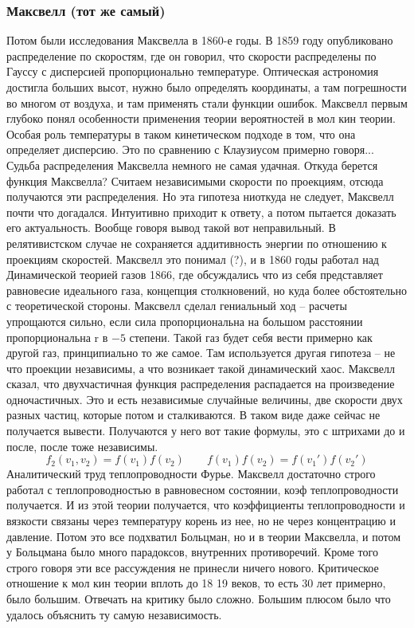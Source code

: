 \documentclass[a4paper, 12pt]{article}
\begin{document}
\subsubsection{Максвелл (тот же самый)}

Потом были исследования Максвелла в 1860-е годы. В 1859 году 
опубликовано распределение по скоростям, где он говорил, что скорости 
распределены по Гауссу с дисперсией пропорционально температуре. 
Оптическая астрономия достигла больших высот, нужно было определять 
координаты, а там погрешности во многом от воздуха, и там применять 
стали функции ошибок. Максвелл первым глубоко понял особенности 
применения теории вероятностей в мол кин теории. Особая роль температуры 
в таком кинетическом подходе в том, что она определяет дисперсию. Это по 
сравнению с Клаузиусом примерно говоря... Судьба распределения Максвелла 
немного не самая удачная. Откуда берется функция Максвелла? Считаем 
независимыми скорости по проекциям, отсюда получаются эти распределения. 
Но эта гипотеза ниоткуда не следует, Максвелл почти что догадался. 
Интуитивно приходит к ответу, а потом пытается доказать его 
актуальность. Вообще говоря вывод такой вот неправильный. 
В релятивистском случае не сохраняется аддитивность энергии по отношению 
к проекциям скоростей. Максвелл это понимал (?), и в 1860 годы работал 
над Динамической теорией газов 1866, где обсуждались что из себя 
представляет равновесие идеального газа, концепция столкновений, но куда 
более обстоятельно с теоретической стороны. Максвелл сделал гениальный 
ход -- расчеты упрощаются сильно, если сила пропорциональна на большом 
расстоянии пропорциональна r в $-5$ степени. Такой газ будет себя вести 
примерно как другой газ, принципиально то же самое. Там используется 
другая гипотеза -- не что проекции независимы, а что возникает такой 
динамический хаос. Максвелл сказал, что двухчастичная функция 
распределения распадается на произведение одночастичных. Это и есть 
независимые случайные величины, две скорости двух разных частиц, которые 
потом и сталкиваются. В таком виде даже сейчас не получается вывести. 
Получаются у него вот такие формулы, это с штрихами до и после, после 
тоже независимы.
$$ f_2(v_1, v_2) = f(v_1)f(v_2) \qquad f(v_1)f(v_2) = f(v_1')f(v_2') $$
Аналитический труд теплопроводности Фурье. Максвелл достаточно строго 
работал с теплопроводностью в равновесном состоянии, коэф 
теплопроводности получается. И из этой теории получается, что 
коэффициенты теплопроводности и вязкости связаны через температуру 
корень из нее, но не через концентрацию и давление. Потом это все 
подхватил Больцман, но и в теории Максвелла, и потом у Больцмана было 
много парадоксов, внутренних противоречий. Кроме того строго говоря эти 
все рассуждения не принесли ничего нового. Критическое отношение к мол 
кин теории вплоть до 18 19 веков, то есть 30 лет примерно, было большим. 
Отвечать на критику было сложно. Большим плюсом было что удалось 
объяснить ту самую независимость.
\end{document}

